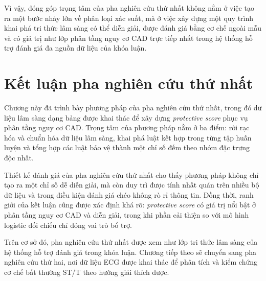 Vì vậy, đóng góp trọng tâm của pha nghiên cứu thứ nhất không nằm ở việc tạo ra một bước nhảy lớn về phân loại xác suất, mà ở việc xây dựng một quy trình khai phá tri thức lâm sàng có thể diễn giải, được đánh giá bằng cơ chế ngoài mẫu và có giá trị như lớp phân tầng nguy cơ CAD trực tiếp nhất trong hệ thống hỗ trợ đánh giá đa nguồn dữ liệu của khóa luận.

\blocksep

\section{Kết luận pha nghiên cứu thứ nhất}

\blocksep

Chương này đã trình bày phương pháp của pha nghiên cứu thứ nhất, trong đó dữ liệu lâm sàng dạng bảng được khai thác để xây dựng \textit{protective score} phục vụ phân tầng nguy cơ CAD. Trọng tâm của phương pháp nằm ở ba điểm: rời rạc hóa và chuẩn hóa dữ liệu lâm sàng, khai phá luật kết hợp trong từng tập huấn luyện và tổng hợp các luật bảo vệ thành một chỉ số đếm theo nhóm đặc trưng độc nhất.

\blocksep

Thiết kế đánh giá của pha nghiên cứu thứ nhất cho thấy phương pháp không chỉ tạo ra một chỉ số dễ diễn giải, mà còn duy trì được tính nhất quán trên nhiều bộ dữ liệu và trong điều kiện đánh giá chéo không rò rỉ thông tin. Đồng thời, ranh giới của kết luận cũng được xác định khá rõ: \textit{protective score} có giá trị nổi bật ở phân tầng nguy cơ CAD và diễn giải, trong khi phần cải thiện so với mô hình logistic đối chiếu chỉ đóng vai trò bổ trợ.

\blocksep

Trên cơ sở đó, pha nghiên cứu thứ nhất được xem như lớp tri thức lâm sàng của hệ thống hỗ trợ đánh giá trong khóa luận. Chương tiếp theo sẽ chuyển sang pha nghiên cứu thứ hai, nơi dữ liệu ECG được khai thác để phân tích và kiểm chứng cơ chế bất thường ST/T theo hướng giải thích được.
